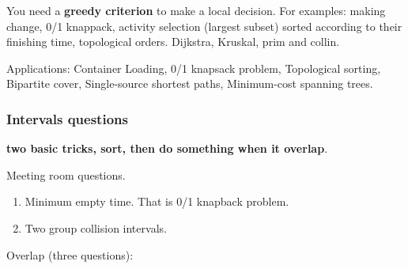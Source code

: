 \documentclass[a4paper,11pt,twoside]{book}
\begin{document}
\par	You need a \textbf{greedy criterion} to make a local decision. For examples: making change, 0/1 knappack,  activity selection (largest subset) sorted according to their finishing time, topological orders. Dijkstra, Kruskal, prim and collin.

\par Applications: Container Loading, 0/1 knapsack problem, Topological sorting, Bipartite cover, Single-source shortest paths, Minimum-cost spanning trees. 


\subsubsection{Intervals questions}

	\par \textbf{two basic tricks, sort, then do something when it overlap}.


	\par Meeting room questions. 
	\begin{enumerate}
		\item Minimum empty time. That is 0/1 knapback problem.
		\item Two group collision intervals.
	\end{enumerate}
	

	\par Overlap (three questions):
	
\end{document}

